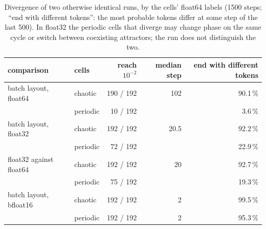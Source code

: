 \begin{table}[tbp]
\centering\small
\begin{tabular}{llrrr}
\toprule
comparison & cells & reach $10^{-2}$ & median step & end with different tokens \\
\midrule
batch layout, float64 & chaotic & 190 / 192 & 102 & 90.1\,\% \\
 & periodic & 10 / 192 & & 3.6\,\% \\
batch layout, float32 & chaotic & 192 / 192 & 20.5 & 92.2\,\% \\
 & periodic & 72 / 192 & & 22.9\,\% \\
float32 against float64 & chaotic & 192 / 192 & 20 & 92.7\,\% \\
 & periodic & 75 / 192 & & 19.3\,\% \\
batch layout, bfloat16 & chaotic & 192 / 192 & 2 & 99.5\,\% \\
 & periodic & 192 / 192 & 2 & 95.3\,\% \\
\bottomrule
\end{tabular}
\caption{Divergence of two otherwise identical runs, by the cells' float64 labels (1500 steps; ``end with different
tokens'': the most probable tokens differ at some step of the last 500). In float32 the periodic cells that diverge may
change phase on the same cycle or switch between coexisting attractors; the run does not distinguish the two.}
\label{tab:repro}
\end{table}

